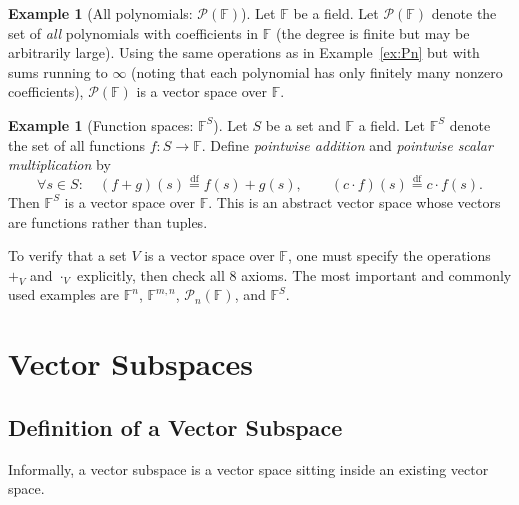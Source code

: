 \documentclass[11pt, a4paper, notitlepage]{report}
\theoremstyle{definition}
\newtheorem{example}[theorem]{Example}
\theoremstyle{remark}
\begin{document}
\begin{example}[All polynomials: $\mathscr{P}(\mathbb{F})$]\label{ex:P}
Let $\mathbb{F}$ be a field. Let $\mathscr{P}(\mathbb{F})$ denote the set of \emph{all} polynomials with coefficients in $\mathbb{F}$ (the degree is finite but may be arbitrarily large). Using the same operations as in Example~\ref{ex:Pn} but with sums running to $\infty$ (noting that each polynomial has only finitely many nonzero coefficients), $\mathscr{P}(\mathbb{F})$ is a vector space over $\mathbb{F}$.
\end{example}

\begin{example}[Function spaces: $\mathbb{F}^S$]\label{ex:FS}
Let $S$ be a set and $\mathbb{F}$ a field. Let $\mathbb{F}^S$ denote the set of all functions $f : S \to \mathbb{F}$. Define \emph{pointwise addition} and \emph{pointwise scalar multiplication} by
\[
  \forall s \in S: \quad (f + g)(s) \stackrel{\mathrm{df}}{=} f(s) + g(s), \qquad (c \cdot f)(s) \stackrel{\mathrm{df}}{=} c \cdot f(s).
\]
Then $\mathbb{F}^S$ is a vector space over $\mathbb{F}$. This is an abstract vector space whose vectors are functions rather than tuples.
\end{example}

\begin{keyresult}[title={Key Result: Recognising Vector Spaces}]
To verify that a set $V$ is a vector space over $\mathbb{F}$, one must specify the operations $+_V$ and $\cdot_V$ explicitly, then check all 8 axioms. The most important and commonly used examples are $\mathbb{F}^n$, $\mathbb{F}^{m,n}$, $\mathscr{P}_n(\mathbb{F})$, and $\mathbb{F}^S$.
\end{keyresult}

\section{Vector Subspaces}
\label{sec:subspaces}

\subsection{Definition of a Vector Subspace}

Informally, a vector subspace is a vector space sitting inside an existing vector space.
\end{document}
